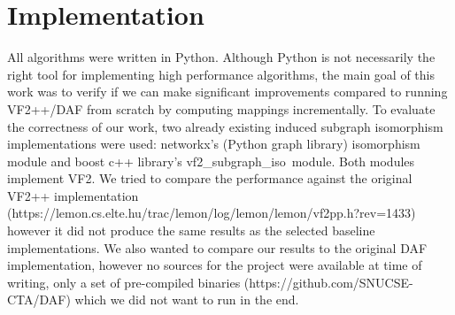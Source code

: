 \chapter{Implementation}

All algorithms were written in Python. Although Python is not necessarily the right tool 
for implementing high performance algorithms, the main goal of this work was to verify if
we can make significant improvements compared to running VF2++/DAF from scratch by computing
mappings incrementally. To evaluate the correctness of our work, two already existing induced 
subgraph isomorphism implementations were used: networkx's (Python graph library) isomorphism 
module and boost c++ library's vf2\_subgraph\_iso\ module. Both modules implement VF2. We 
tried to compare the performance against the original VF2++ implementation (https://lemon.cs.elte.hu/trac/lemon/log/lemon/lemon/vf2pp.h?rev=1433)
however it did not produce the same results as the selected baseline implementations. We also
wanted to compare our results to the original DAF implementation, however no sources for the
project were available at time of writing, only a set of pre-compiled binaries (https://github.com/SNUCSE-CTA/DAF)
which we did not want to run in the end.
